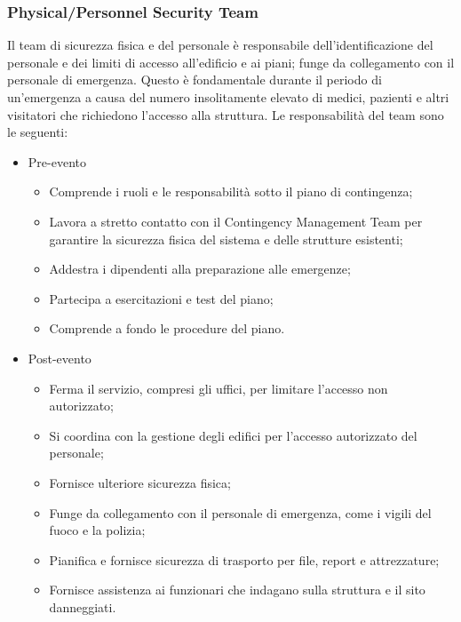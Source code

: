 \documentclass[12pt, a4paper, titlepage]{report}
\begin{document}
			\subsubsection{Physical/Personnel Security Team}
			Il team di sicurezza fisica e del personale è responsabile dell'identificazione del personale e dei limiti di accesso all'edificio e ai piani; funge da collegamento con il personale di emergenza. Questo è fondamentale durante il periodo di un'emergenza a causa del numero insolitamente elevato di medici, pazienti e altri visitatori che richiedono l'accesso alla struttura.
			Le responsabilità del team sono le seguenti:
			\begin{itemize}
				\item Pre-evento
				\begin{itemize}
					\item Comprende i ruoli e le responsabilità sotto il piano di contingenza;
					\item Lavora a stretto contatto con il Contingency Management Team per garantire la sicurezza fisica del sistema e delle strutture esistenti;
					\item Addestra i dipendenti alla preparazione alle emergenze;
					\item Partecipa a esercitazioni e test del piano;
					\item Comprende a fondo le procedure del piano.
				\end{itemize}
				\item Post-evento
				\begin{itemize}
					\item Ferma il servizio, compresi gli uffici, per limitare l'accesso non autorizzato;
					\item Si coordina con la gestione degli edifici per l'accesso autorizzato del personale;
					\item Fornisce ulteriore sicurezza fisica;
					\item Funge da collegamento con il personale di emergenza, come i vigili del fuoco e la polizia;
					\item Pianifica e fornisce sicurezza di trasporto per file, report e attrezzature;
					\item Fornisce assistenza ai funzionari che indagano sulla struttura e il sito danneggiati.
				\end{itemize}
			\end{itemize}
		
\end{document}
